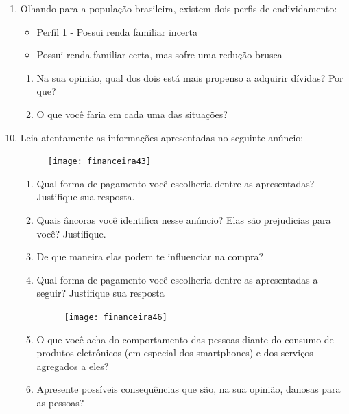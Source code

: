 \begin{enumerate}
\item Olhando para a população brasileira, existem dois perfis de endividamento:
  \begin{itemize}
  \item Perfil 1 - Possui renda familiar incerta
  \item Possui renda familiar certa, mas sofre uma redução brusca
  \end{itemize}
  \begin{enumerate}
  \item Na sua opinião, qual dos dois está mais propenso a adquirir dívidas? Por que?
  \item O que você faria em cada uma das situações?
  \end{enumerate}
\end{enumerate}
\clearpage

\begin{enumerate}
  \setcounter{enumi}{9}
\item Leia atentamente as informações apresentadas no seguinte anúncio:

\begin{figure}[H]
\centering

\texttt{[image: financeira43]}
\end{figure}

  \begin{enumerate}
  \item Qual forma de pagamento você escolheria dentre as apresentadas? Justifique sua resposta.
  \item Quais âncoras você identifica nesse anúncio? Elas são prejudicias para você? Justifique.
  \item De que maneira elas podem te influenciar na compra?
  \item Qual forma de pagamento você escolheria dentre as apresentadas a seguir? Justifique sua resposta
  \begin{figure}[H]
  \centering

  \texttt{[image: financeira46]}
  \end{figure}
  \item O que você acha do comportamento das pessoas diante do consumo de produtos eletrônicos (em especial dos smartphones) e dos serviços agregados a eles?
  \item Apresente possíveis consequências que são, na sua opinião, danosas para as pessoas?
  \end{enumerate}
\end{enumerate}

